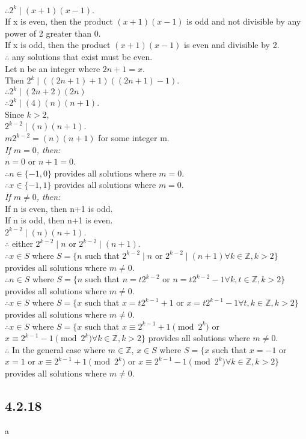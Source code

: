\documentclass{article}
\begin{document}
\\$\therefore 2^k \mid (x + 1)(x - 1)$.
\\If x is even, then the product $(x + 1)(x - 1)$ is odd and not divisible by any power of 2 greater than 0.
\\If x is odd, then the product $(x + 1)(x - 1)$ is even and divisible by 2.
\\$\therefore$ any solutions that exist must be even.
\\Let n be an integer where $2n+1 = x$.
\\Then $2^k \mid ((2n+1) + 1)((2n+1) - 1)$.
\\$\therefore 2^k \mid (2n+2)(2n)$
\\$\therefore 2^k \mid (4)(n)(n+1)$.
\\Since $k>2$,
\\$2^{k-2} \mid (n)(n+1)$.
\\$m2^{k-2} = (n)(n+1)$ for some integer m.
\\\emph{If $m=0$, then:}
\\$n=0$ or $n+1=0$.
\\$\therefore n \in \{-1, 0\}$ provides all solutions where $m=0$.
\\$\therefore x \in \{-1, 1\}$ provides all solutions where $m=0$.
\\\emph{If $m \neq 0$, then:}
\\If n is even, then n+1 is odd. 
\\If n is odd, then n+1 is even. 
\\$2^{k-2} \mid (n)(n+1)$.
\\$\therefore$ either $2^{k-2} \mid n$ or $2^{k-2} \mid (n+1)$.
\\$\therefore x \in S$ where $S = \{n$ such that $2^{k-2} \mid n$ or $2^{k-2} \mid (n+1)$\;\;$\forall k \in \mathbb{Z}, k>2\}$ provides all solutions where $m \neq 0$.
\\$\therefore n \in S$ where $S = \{n$ such that $n = t2^{k-2}$ or $n = t2^{k-2} - 1$\;\;$\forall k,t \in \mathbb{Z}, k>2\}$ provides all solutions where $m \neq 0$.
\\$\therefore x \in S$ where $S = \{x$ such that $x = t2^{k-1}+1$ or $x = t2^{k-1}-1$\;\;$\forall t,k \in \mathbb{Z}, k>2\}$ provides all solutions where $m \neq 0$.
\\$\therefore x \in S$ where $S = \{x$ such that $x \equiv 2^{k-1}+1 \pmod{2^k}$ or $x \equiv 2^{k-1}-1 \pmod{2^k}$\;\;$\forall k \in \mathbb{Z}, k>2\}$ provides all solutions where $m \neq 0$.
\\$\therefore$ In the general case where $m \in \mathbb{Z}$, $x \in S$ where $S = \{x$ such that $x=-1$ or $x=1$ or $x \equiv 2^{k-1}+1 \pmod{2^k}$ or $x \equiv 2^{k-1}-1 \pmod{2^k}$\;\;$\forall k \in \mathbb{Z}, k>2\}$ provides all solutions where $m \neq 0$.

\subsection{4.2.18}
a
\\
\end{document}
